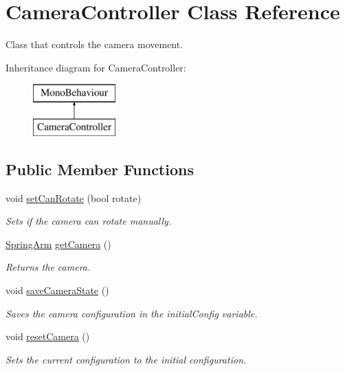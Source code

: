 \hypertarget{class_camera_controller}{}\section{Camera\+Controller Class Reference}
\label{class_camera_controller}


Class that controls the camera movement.  


Inheritance diagram for Camera\+Controller\+:\begin{figure}[H]
\begin{center}
\leavevmode
\includegraphics[height=2.000000cm]{class_camera_controller}
\end{center}
\end{figure}
\subsection*{Public Member Functions}
\begin{DoxyCompactItemize}
\item 
void \mbox{\hyperlink{class_camera_controller_a4b49ea92545c33fcbd37d39004300f6a}{set\+Can\+Rotate}} (bool rotate)
\begin{DoxyCompactList}\small\item\em Sets if the camera can rotate manually. \end{DoxyCompactList}\item 
\mbox{\hyperlink{class_spring_arm}{Spring\+Arm}} \mbox{\hyperlink{class_camera_controller_a6be56fdf0a1bea6589acaa9a7d6982b9}{get\+Camera}} ()
\begin{DoxyCompactList}\small\item\em Returns the camera. \end{DoxyCompactList}\item 
void \mbox{\hyperlink{class_camera_controller_afc12a02f3edac81d6ea356ed6b1084ca}{save\+Camera\+State}} ()
\begin{DoxyCompactList}\small\item\em Saves the camera configuration in the initial\+Config variable. \end{DoxyCompactList}\item 
void \mbox{\hyperlink{class_camera_controller_abb8319c370c8608d49054dbf21ad1630}{reset\+Camera}} ()
\begin{DoxyCompactList}\small\item\em Sets the current configuration to the initial configuration. \end{DoxyCompactList}\end{DoxyCompactItemize}


